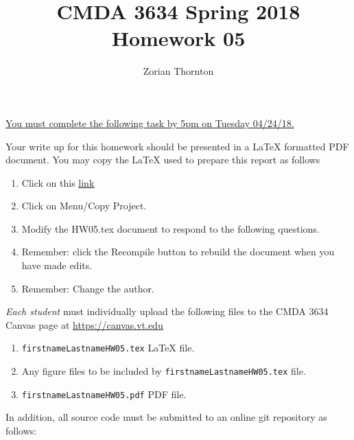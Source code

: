 \documentclass{article}
\newcommand{\pad}{\vspace{8pt}\noindent}
\newcommand{\myhref}[2]{\href{#1}{\color{foo}\underline{#2}\color{black}}}
\begin{document}
\title{CMDA 3634 Spring 2018 Homework 05}

\author{Zorian Thornton}
\vspace{-64pt}\maketitle
\begin{center}\underline{You must complete the following task by 5pm on Tuesday 04/24/18.}\end{center}
Your write up for this homework should be presented in a {\LaTeX} formatted PDF document. You may copy the \LaTeX{} used to prepare this report as follows

\begin{enumerate}
\item Click on this  \myhref{https://www.sharelatex.com/read/cyvqcnwmfnsc}{link} 
\item Click on Menu/Copy Project.
\item Modify the HW05.tex document to respond to the following questions. 
\item Remember: click the Recompile button to rebuild the document when you have made edits.
\item Remember: Change the author. 

\end{enumerate}

\pad \emph{Each student} must individually upload the following files to the CMDA 3634 Canvas page at \myhref{https://canvas.vt.edu}{https://canvas.vt.edu}

\begin{enumerate}
\item \verb|firstnameLastnameHW05.tex| {\LaTeX} file.
\item Any figure files to be included by \verb|firstnameLastnameHW05.tex| file.
\item \verb|firstnameLastnameHW05.pdf| PDF file.
\end{enumerate}

\noindent In addition, all source code must be submitted to an online git repository as follows:
\end{document}
